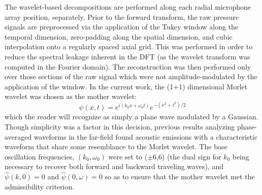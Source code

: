 \documentclass[english]{aiaa-tc}
\begin{document}
The wavelet-based
decompositions are performed along each radial microphone array
position, separately. Prior to the forward transform, the raw pressure signals are preprocessed via
the application of the Tukey window along the temporal dimension,
zero-padding along the spatial dimension, and cubic interpolation onto
a regularly spaced axial grid. This was performed in order to reduce the
spectral leakage inherent in the DFT (as the wavelet transform was
computed in the Fourier domain). The reconstruction was then performed
only over those sections of the raw signal which were not
amplitude-modulated by the application of the window. In the current
work, the (1+1) dimensional Morlet wavelet was chosen as the mother
wavelet: 
\begin{equation}
\psi(x,t)=e^{i(k_{0}x+\omega_{0}t)}e^{-(x^{2}+t^{2})/2}
\end{equation}
which the reader will recognize as simply a plane wave modulated by a
Gaussian. Though simplicity was a factor in this decision, previous
results analyzing phase-averaged waveforms in the far-field found
acoustic emissions with a characteristic waveform that share some
resemblance to the Morlet wavelet\cite{Crawley2014}. The base
oscillation frequencies, $(k_{0},\omega_{0})$ were set to ($\pm$6,6)
(the dual sign for $k_{0}$ being necessary to recover both forward and
backward traveling waves), and $\hat{\psi}(k,0)=0$ and $\hat{\psi}
(0,\omega) =0$ so as to ensure that the mother wavelet met the
admissibility criterion. 
 
\end{document}

